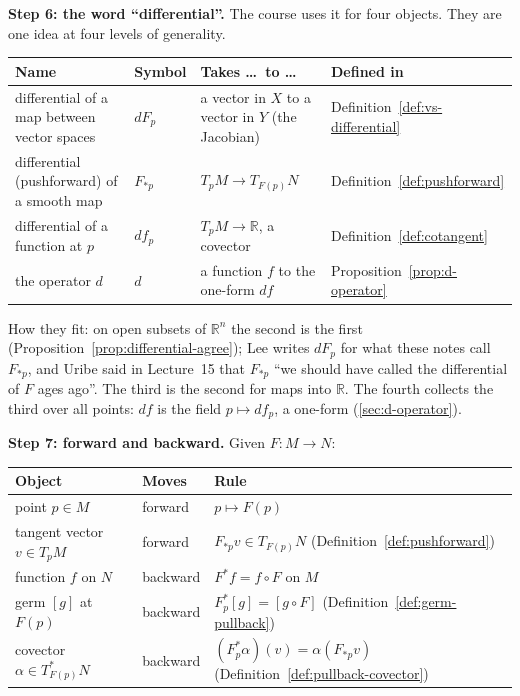 \documentclass[11pt]{report}
\begin{document}
\textbf{Step 6: the word ``differential''.} The course uses it for four objects. They are one idea at four levels of generality.

\begin{center}
\renewcommand{\arraystretch}{1.3}
\begin{tabular}{p{} p{} p{} p{}}
\hline
Name & Symbol & Takes \ldots\ to \ldots & Defined in \\
\hline
differential of a map between vector spaces & $dF_p$ & a vector in $X$ to a vector in $Y$ (the Jacobian) & Definition~\ref{def:vs-differential} \\
differential (pushforward) of a smooth map & $F_{*p}$ & $T_pM \to T_{F(p)}N$ & Definition~\ref{def:pushforward} \\
differential of a function at $p$ & $df_p$ & $T_pM \to \mathbb{R}$, a covector & Definition~\ref{def:cotangent} \\
the operator $d$ & $d$ & a function $f$ to the one-form $df$ & Proposition~\ref{prop:d-operator} \\
\hline
\end{tabular}
\end{center}

How they fit: on open subsets of $\mathbb{R}^n$ the second is the first (Proposition~\ref{prop:differential-agree}); Lee writes $dF_p$ for what these notes call $F_{*p}$, and Uribe said in Lecture~15 that $F_{*p}$ ``we should have called the differential of $F$ ages ago''. The third is the second for maps into $\mathbb{R}$. The fourth collects the third over all points: $df$ is the field $p \mapsto df_p$, a one-form (\ref{sec:d-operator}).

\textbf{Step 7: forward and backward.} Given $F : M \to N$:

\begin{center}
\renewcommand{\arraystretch}{1.3}
\begin{tabular}{p{} p{} p{}}
\hline
Object & Moves & Rule \\
\hline
point $p \in M$ & forward & $p \mapsto F(p)$ \\
tangent vector $v \in T_pM$ & forward & $F_{*p}v \in T_{F(p)}N$ (Definition~\ref{def:pushforward}) \\
function $f$ on $N$ & backward & $F^*f = f \circ F$ on $M$ \\
germ $[g]$ at $F(p)$ & backward & $F_p^*[g] = [g \circ F]$ (Definition~\ref{def:germ-pullback}) \\
covector $\alpha \in T^*_{F(p)}N$ & backward & $(F_p^*\alpha)(v) = \alpha(F_{*p}v)$ (Definition~\ref{def:pullback-covector}) \\
\hline
\end{tabular}
\end{center}
\end{document}
